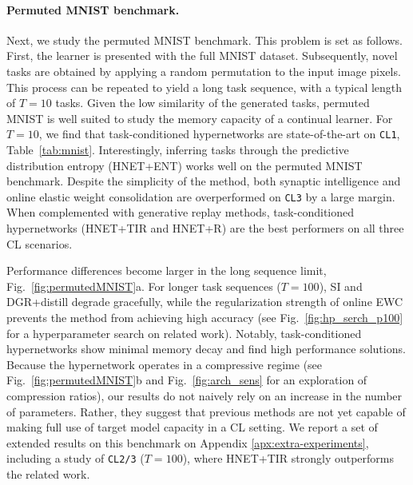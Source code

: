 \documentclass{article}
\begin{document}
\paragraph{Permuted MNIST benchmark.} Next, we study the permuted MNIST benchmark. This problem is set as follows. First, the learner is presented with the full MNIST dataset. Subsequently, novel tasks are obtained by applying a random permutation to the input image pixels. This process can be repeated to yield a long task sequence, with a typical length of $T=10$ tasks. Given the low similarity of the generated tasks, permuted MNIST is well suited to study the memory capacity of a continual learner. For $T=10$, we find that task-conditioned hypernetworks are state-of-the-art on \texttt{CL1}, Table~\ref{tab:mnist}. Interestingly, inferring tasks through the predictive distribution entropy (HNET+ENT) works well on the permuted MNIST benchmark. Despite the simplicity of the method, both synaptic intelligence \citep[SI;][]{zenke_continual_2017} and online elastic weight consolidation \citep[EWC;][]{schwarz_progress_2018} are overperformed on \texttt{CL3} by a large margin. When complemented with generative replay methods, task-conditioned hypernetworks (HNET+TIR and HNET+R) are the best performers on all three CL scenarios.

Performance differences become larger in the long sequence limit, Fig.~\ref{fig:permutedMNIST}a. For longer task sequences ($T=100$), SI and DGR+distill \citep{shin_continual_2017,van_de_ven_generative_2018} degrade gracefully, while the regularization strength of online EWC prevents the method from achieving high accuracy (see Fig.~\ref{fig:hp_serch_p100} for a hyperparameter search on related work). Notably, task-conditioned hypernetworks show minimal memory decay and find high performance solutions. Because the hypernetwork operates in a compressive regime (see Fig.~\ref{fig:permutedMNIST}b and Fig.~\ref{fig:arch_sens} for an exploration of compression ratios), our results do not naively rely on an increase in the number of parameters. Rather, they suggest that previous methods are not yet capable of making full use of target model capacity in a CL setting. We report a set of extended results on this benchmark on Appendix \ref{apx:extra-experiments}, including a study of \texttt{CL2/3} ($T=100$), where HNET+TIR strongly outperforms the related work.
\end{document}
